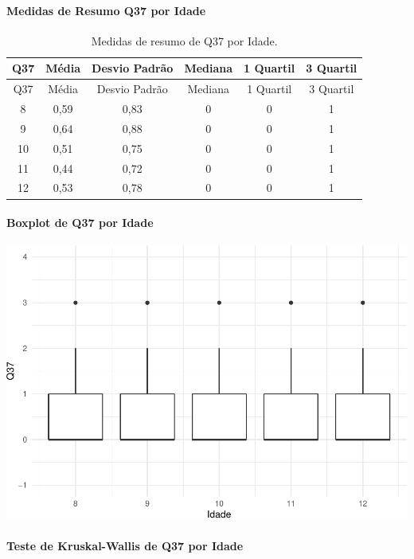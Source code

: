 \documentclass[]{article}
\let\oldparagraph\paragraph
\renewcommand{\paragraph}[1]{\oldparagraph{#1}\mbox{}}
\begin{document}
\cleardoublepage

\hypertarget{medidas-de-resumo-q37-por-idade}{%
\paragraph{Medidas de Resumo Q37 por Idade}\label{medidas-de-resumo-q37-por-idade}}

\begin{longtable}[]{@{}cccccc@{}}
\caption{\label{tab:unnamed-chunk-1393}Medidas de resumo de Q37 por Idade.}\tabularnewline
\toprule
Q37 & Média & Desvio Padrão & Mediana & 1 Quartil & 3 Quartil\tabularnewline
\midrule
\endfirsthead
\toprule
Q37 & Média & Desvio Padrão & Mediana & 1 Quartil & 3 Quartil\tabularnewline
\midrule
\endhead
8 & 0,59 & 0,83 & 0 & 0 & 1\tabularnewline
9 & 0,64 & 0,88 & 0 & 0 & 1\tabularnewline
10 & 0,51 & 0,75 & 0 & 0 & 1\tabularnewline
11 & 0,44 & 0,72 & 0 & 0 & 1\tabularnewline
12 & 0,53 & 0,78 & 0 & 0 & 1\tabularnewline
\bottomrule
\end{longtable}

\hypertarget{boxplot-de-q37-por-idade}{%
\paragraph{Boxplot de Q37 por Idade}\label{boxplot-de-q37-por-idade}}

\begin{center}\includegraphics[width=0.75\linewidth]{relatorio_covid19_files/figure-latex/unnamed-chunk-1394-1} \end{center}

\hypertarget{teste-de-kruskal-wallis-de-q37-por-idade}{%
\paragraph{Teste de Kruskal-Wallis de Q37 por Idade}\label{teste-de-kruskal-wallis-de-q37-por-idade}}
\end{document}
